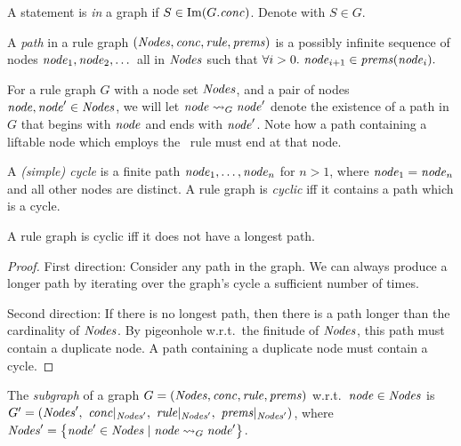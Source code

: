 A statement is \emph{in} a graph if $S \in \mathrm{Im}(G.\mathit{conc})$.
Denote with $S \in G$.

\begin{definition}
    A \emph{path} in a rule graph $(\mathit{Nodes},\mathit{conc},\mathit{rule},\mathit{prems})$
    is a possibly infinite sequence of nodes
    $\mathit{node}_1,\mathit{node}_2,\dots$
    all in $\mathit{Nodes}$
    such that
    $\forall i > 0.\
    \mathit{node}_{i+1} \in \mathit{prems}(\mathit{node}_i).
    $
\end{definition}

\newcommand*{\reaches}[3]{%
    \ensuremath{#1 \leadsto_{#3} #2}%
}
For a rule graph $G$ with a node set $\mathit{Nodes}$,
and a pair of nodes $\mathit{node}, \mathit{node}' \in \mathit{Nodes}$,
we will let \reaches{\node}{\node'}{G} denote
the existence of a path in $G$
that begins with $\mathit{node}$ and ends with $\mathit{node}'$.
Note how a path containing a liftable node 
which employs the \LIFT\ rule must end at that node.

\begin{definition}
    A \emph{(simple) cycle} is a finite path $\mathit{node}_1,\dots,\mathit{node}_n$
    for $n>1$,
    where $\mathit{node}_1 = \mathit{node}_n$ and all other nodes are distinct.
    A rule graph is \emph{cyclic}
    iff it contains a path which is a cycle.
\end{definition}


\begin{lemma}
    A rule graph is cyclic iff
    it does not have a longest path.
\end{lemma}
\begin{proof}
First direction:
Consider any path in the graph.
We can always produce a longer path by iterating over the graph's cycle a sufficient number of times.

Second direction:
If there is no longest path, then there is a path longer than the cardinality of $\mathit{Nodes}$. By pigeonhole w.r.t.\ the finitude of $\mathit{Nodes}$,
this path must contain a duplicate node.
A path containing a duplicate node must contain a cycle.
\end{proof}

\newcommand{\restrict}[2]{%
    #1 {\mid_{#2}} %
}

\iffalse
\begin{definition}
    The \emph{subgraph} of a graph $G=(\mathit{Nodes},\mathit{conc},\mathit{rule},\mathit{prems})$ w.r.t.\ $\mathit{node} \in \mathit{Nodes}$
    is 
    \\
    $G'=(
        \DomNode',\
        \restrict\MapConc{\DomNode'},\
        \restrict\MapRule{\DomNode'},\
        \restrict\MapPrems{\DomNode'}
    )$,
    where $\DomNode' = 
        \SetBuild(\node' \in \DomNode | \reaches{\node}{\node'}{G})$.
\end{definition}

